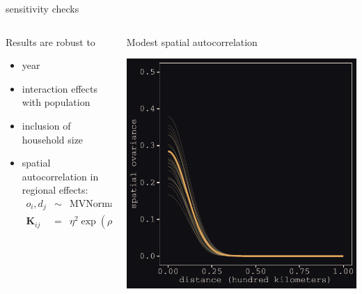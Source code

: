 \documentclass{beamer}
\begin{document}
\begin{frame}{sensitivity checks}
			\begin{columns}
		\begin{column}{0.5\textwidth}
				Results are \alert{robust} to
				\begin{itemize}
					\item year\pause
					\item interaction effects with population \pause
				  \item inclusion of household size \pause
				  \item spatial autocorrelation in regional effects:
					\begin{eqnarray*}
					  o_{i}, d_{j}& \sim &\text{MVNormal}(0, \mathbf{K})\\
					  \mathbf{K}_{ij} & = & \eta^{2}\exp(\rho^{2}\mathbf{D}_{ij})
					\end{eqnarray*}
					\pause
				  \end{itemize}
		\end{column}
		\begin{column}{0.5\textwidth}
			\alert{Modest} spatial autocorrelation
			\begin{center}
				\includegraphics[width=\textwidth]{../../fig/spatial_autocorrelation}
			\end{center}
		\end{column}
	\end{columns}
\end{frame}
\end{document}
